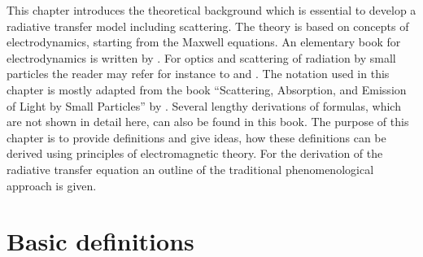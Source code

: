  This chapter introduces the theoretical background which is essential
 to develop a radiative transfer model including scattering. The theory
 is based on concepts of electrodynamics, starting from the Maxwell
 equations.  An elementary book for electrodynamics is written by
 \citet{jackson98:_class}.  For optics and scattering of radiation by
 small particles the reader may refer for instance to
 \citet{hulst57:_light_scatt_small} and \citet{bohren:98}. The notation
 used in this chapter is mostly adapted from the book ``Scattering,
 Absorption, and Emission of Light by Small Particles'' by
 \citet{Mishchenko:02}. Several lengthy derivations of formulas, which
 are not shown in detail here, can also be found in this book. The
 purpose of this chapter is to provide definitions and give ideas, how
 these definitions can be derived using principles of electromagnetic
 theory. For the derivation of the radiative transfer equation an
 outline of the traditional phenomenological approach is given.
 
 \section{Basic definitions}
 
